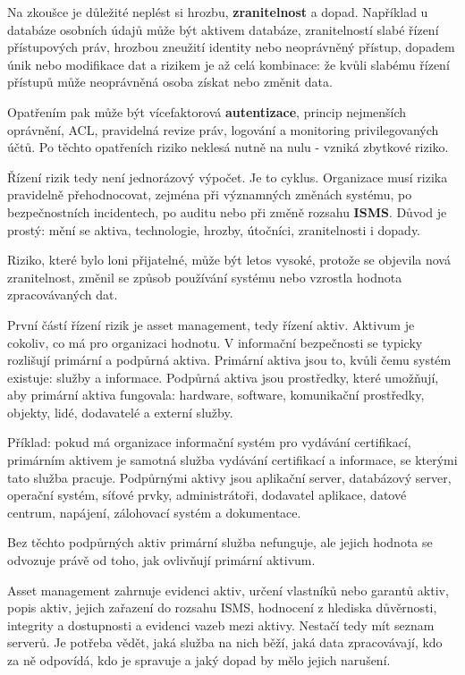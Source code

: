 Na zkoušce je důležité neplést si hrozbu, \textbf{zranitelnost} a dopad. Například u databáze osobních údajů může být aktivem databáze, zranitelností slabé řízení přístupových práv, hrozbou zneužití identity nebo neoprávněný přístup, dopadem únik nebo modifikace dat a rizikem je až celá kombinace: že kvůli slabému řízení přístupů může neoprávněná osoba získat nebo změnit data.

Opatřením pak může být vícefaktorová \textbf{autentizace}, princip nejmenších oprávnění, ACL, pravidelná revize práv, logování a monitoring privilegovaných účtů. Po těchto opatřeních riziko neklesá nutně na nulu - vzniká zbytkové riziko.

Řízení rizik tedy není jednorázový výpočet. Je to cyklus. Organizace musí rizika pravidelně přehodnocovat, zejména při významných změnách systému, po bezpečnostních incidentech, po auditu nebo při změně rozsahu \textbf{ISMS}. Důvod je prostý: mění se aktiva, technologie, hrozby, útočníci, zranitelnosti i dopady.

Riziko, které bylo loni přijatelné, může být letos vysoké, protože se objevila nová zranitelnost, změnil se způsob používání systému nebo vzrostla hodnota zpracovávaných dat.

První částí řízení rizik je asset management, tedy řízení aktiv. Aktivum je cokoliv, co má pro organizaci hodnotu. V informační bezpečnosti se typicky rozlišují primární a podpůrná aktiva. Primární aktiva jsou to, kvůli čemu systém existuje: služby a informace. Podpůrná aktiva jsou prostředky, které umožňují, aby primární aktiva fungovala: hardware, software, komunikační prostředky, objekty, lidé, dodavatelé a externí služby.

Příklad: pokud má organizace informační systém pro vydávání certifikací, primárním aktivem je samotná služba vydávání certifikací a informace, se kterými tato služba pracuje. Podpůrnými aktivy jsou aplikační server, databázový server, operační systém, síťové prvky, administrátoři, dodavatel aplikace, datové centrum, napájení, zálohovací systém a dokumentace.

Bez těchto podpůrných aktiv primární služba nefunguje, ale jejich hodnota se odvozuje právě od toho, jak ovlivňují primární aktivum.

Asset management zahrnuje evidenci aktiv, určení vlastníků nebo garantů aktiv, popis aktiv, jejich zařazení do rozsahu ISMS, hodnocení z hlediska důvěrnosti, integrity a dostupnosti a evidenci vazeb mezi aktivy. Nestačí tedy mít seznam serverů. Je potřeba vědět, jaká služba na nich běží, jaká data zpracovávají, kdo za ně odpovídá, kdo je spravuje a jaký dopad by mělo jejich narušení.

